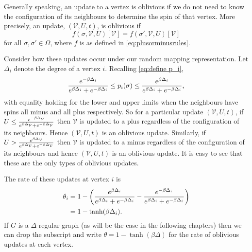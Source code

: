 	Generally speaking, an update to a vertex is oblivious if we do not need to know the configuration of its neighbours to determine the spin of that vertex. More precisely, an update, $(\mathcal{V}, U, t)$, is oblivious if 
	\begin{equation}
		f(\sigma, \mathcal{V}, U)[\mathcal{V}] = f(\sigma', \mathcal{V}, U)[\mathcal{V}]
	\end{equation}
	for all $\sigma, \sigma' \in \Omega$, where $f$ is as defined in \eqref{eq:plusorminusrules}.

	Consider how these updates occur under our random mapping representation. Let $\Delta_i$ denote the degree of a vertex $i$. Recalling \eqref{eq:define p_i},
	\begin{equation}
		\frac{e^{-\beta \Delta_i}}{e^{\beta \Delta_i} + e^{-\beta \Delta_i}} \leq p_i(\sigma) \leq \frac{e^{\beta \Delta_i}}{e^{\beta \Delta_i} + e^{-\beta \Delta_i}},
	\end{equation}
	with equality holding for the lower and upper limits when the neighbours have spins all minus and all plus respectively. So for a particular update $(\mathcal{V}, U, t)$, if $U \leq \frac{e^{-\beta \Delta_\mathcal{V}}}{e^{\beta \Delta_\mathcal{V}} + e^{-\beta \Delta_\mathcal{V}}}$ then $\mathcal{V}$ is updated to a plus regardless of the configuration of its neighbours. Hence $(\mathcal{V}, U, t)$ is an oblivious update. Similarly, if $U > \frac{e^{\beta \Delta_\mathcal{V}}}{e^{\beta \Delta_\mathcal{V}} + e^{-\beta \Delta_\mathcal{V}}}$ then $\mathcal{V}$ is updated to a minus regardless of the configuration of its neighbours and hence $(\mathcal{V}, U, t)$ is an oblivious update. It is easy to see that these are the only types of oblivious updates.
	
	The rate of these updates at vertex $i$ is
	\begin{align}
		\theta_i &= 1 - \left(\frac{e^{\beta \Delta_i}}{e^{\beta \Delta_i} + e^{-\beta \Delta_i}} - \frac{e^{-\beta \Delta_i}}{e^{\beta \Delta_i} + e^{-\beta \Delta_i}}\right)\\
			&= 1 - \tanh(\beta \Delta_i).
	\end{align}
	If $G$ is a $\Delta$-regular graph (as will be the case in the following chapters) then we can drop the subscript and write $\theta = 1 - \tanh(\beta \Delta)$ for the rate of oblivious updates at each vertex.

